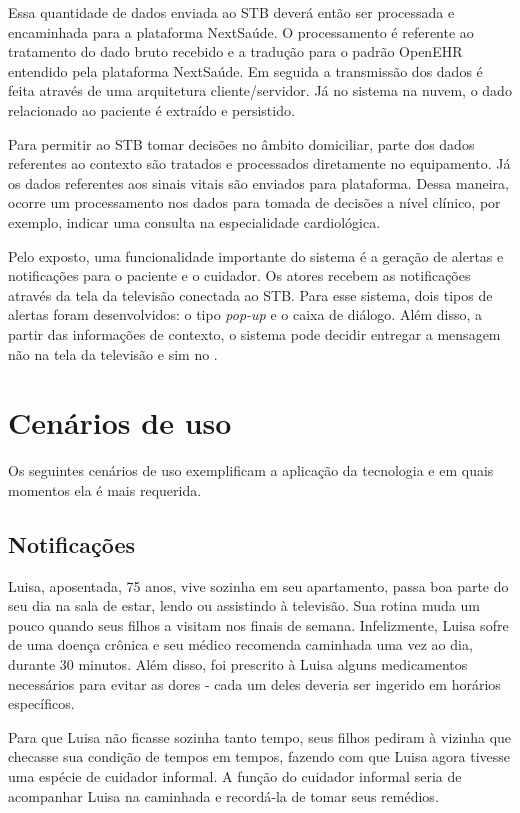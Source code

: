 Essa quantidade de dados enviada ao STB deverá então ser processada e encaminhada
para a plataforma NextSaúde. O processamento é referente ao tratamento do dado
bruto recebido e a tradução para o padrão OpenEHR entendido pela plataforma
NextSaúde. Em seguida a transmissão dos dados é feita através de uma
arquitetura  cliente/servidor. Já no sistema na nuvem, o dado relacionado ao
paciente é extraído e persistido.

Para permitir ao STB tomar decisões no âmbito domiciliar, parte dos dados
referentes ao contexto são tratados e processados diretamente no equipamento.
Já os dados referentes aos sinais vitais são enviados para plataforma. Dessa 
maneira, ocorre um processamento nos dados para tomada de decisões a nível
clínico, por exemplo, indicar uma consulta na especialidade cardiológica.

Pelo exposto, uma funcionalidade importante do sistema é a geração de alertas e
notificações para o paciente e o cuidador. Os atores recebem as notificações
através da tela da televisão conectada ao STB. Para esse sistema, dois tipos de
alertas foram desenvolvidos: o tipo \textit{pop-up} e o caixa de diálogo.
Além disso, a partir das informações de contexto, o sistema pode decidir
entregar a mensagem não na tela da televisão e sim no \smartphone.

\section{Cenários de uso} \label{sec:cenarios-de-uso}

Os seguintes cenários de uso exemplificam a aplicação da tecnologia e em quais
momentos ela é mais requerida.

\subsection{Notificações}\label{subsec:notificacoes}

Luisa, aposentada, 75 anos, vive sozinha em seu apartamento, passa boa parte do
seu dia na sala de estar, lendo ou assistindo à televisão. Sua rotina muda um
pouco quando seus filhos a visitam nos finais de semana. Infelizmente, Luisa
sofre de uma doença crônica e seu médico recomenda caminhada uma vez ao dia,
durante 30 minutos. Além disso, foi prescrito à Luisa alguns medicamentos
necessários para evitar as dores - cada um deles deveria ser ingerido em
horários específicos.

Para que Luisa não ficasse sozinha tanto tempo, seus filhos pediram à vizinha
que checasse sua condição de tempos em tempos, fazendo com que Luisa agora tivesse uma
espécie de cuidador informal. A função do cuidador informal seria de acompanhar
Luisa na caminhada e recordá-la de tomar seus remédios.

